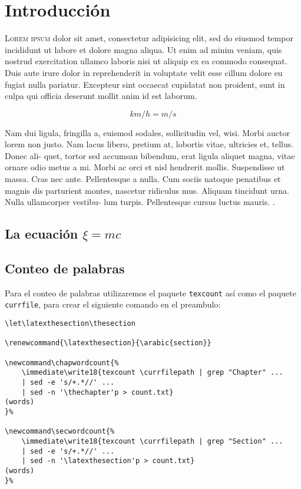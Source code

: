 
\chapter{Introducción}
\lettrine[lines=3]{L}{orem ipsum} dolor sit amet, consectetur adipisicing elit, sed do eiusmod tempor incididunt ut labore et dolore magna aliqua. Ut enim ad minim veniam, quis nostrud exercitation ullamco laboris nisi ut aliquip ex ea commodo consequat. Duis aute irure dolor in reprehenderit in voluptate velit esse cillum dolore eu fugiat nulla pariatur. Excepteur sint occaecat cupidatat non proident, sunt in culpa qui officia deserunt mollit anim id est laborum\citep{ejemplo01}.\chapwordcount


\begin{equation*}
  \si{km\per h = m\per s}
\end{equation*}

Nam dui ligula, fringilla a, euismod sodales, sollicitudin vel, wisi. Morbi auctor lorem
non justo. Nam lacus libero, pretium at, lobortis vitae, ultricies et, tellus. Donec ali-
quet, tortor sed accumsan bibendum, erat ligula aliquet magna, vitae ornare odio
metus a mi. Morbi ac orci et nisl hendrerit mollis. Suspendisse ut massa. Cras nec
ante. Pellentesque a nulla. Cum sociis natoque penatibus et magnis dis parturient
montes, nascetur ridiculus mus. Aliquam tincidunt urna. Nulla ullamcorper vestibu-
lum turpis. Pellentesque cursus luctus mauris.
\cite{ejemplo02}.\chapwordcount


\section{La ecuación \texorpdfstring{$\xi=mc$}{E=mc}}\label{sec:ecuacion}
\lipsum[3]
\secwordcount

\section{Conteo de palabras}
Para el conteo de palabras utilizaremos el paquete \texttt{texcount} así como el paquete \texttt{currfile}, para crear el siguiente comando en el preambulo:\secwordcount

\begin{verbatim}
\let\latexthesection\thesection

\renewcommand{\latexthesection}{\arabic{section}}

\newcommand\chapwordcount{%
    \immediate\write18{texcount \currfilepath | grep "Chapter" ...
    | sed -e 's/+.*//' ...
    | sed -n '\thechapter'p > count.txt}
(words)
}%

\newcommand\secwordcount{%
    \immediate\write18{texcount \currfilepath | grep "Section" ...
    | sed -e 's/+.*//' ...
    | sed -n '\latexthesection'p > count.txt}
(words)
}%
\end{verbatim}

